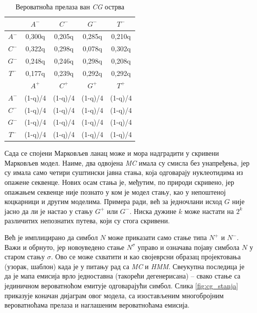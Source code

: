 \documentclass[12pt,oneside]{memoir}
\begin{document}
\begin{CJK}{UTF8}{ipxm}
\begin{table}[h!]
  \centering
  \caption{Вероватноћа прелаза ван \textit{CG} острва}
  \begin{tabular}{c | c c c c}
   & $A^-$ & $C^-$ & $G^-$ & $T^-$ \\ \hline
  $A^-$ & 0,300q & 0,205q & 0,285q & 0,210q \\
  $C^-$ & 0,322q & 0,298q & 0,078q & 0,302q \\
  $G^-$ & 0,248q & 0,246q & 0,298q & 0,208q \\
  $T^-$ & 0,177q & 0,239q & 0,292q & 0,292q \\ \hhline{= | = = = =}
   & $A^+$ & $C^+$ & $G^+$ & $T^+$ \\ \hline
  $A^-$ & (1-q)/4 & (1-q)/4 & (1-q)/4 & (1-q)/4 \\
  $C^-$ & (1-q)/4 & (1-q)/4 & (1-q)/4 & (1-q)/4 \\
  $G^-$ & (1-q)/4 & (1-q)/4 & (1-q)/4 & (1-q)/4 \\
  $T^-$ & (1-q)/4 & (1-q)/4 & (1-q)/4 & (1-q)/4
  \end{tabular}
  \label{tab:cg_hmm2}
\end{table}

Сада се спојени Марковљев ланац може и мора надградити у скривени Марковљев модел. Наиме, два одвојена \textit{MC} имала су смисла без унапређења, јер су имала само четири суштински јавна стања, која одговарају нуклеотидима из опажене секвенце. Нових осам стања је, међутим, по природи скривено, јер опажањем секвенце није познато у ком је модел стању, као у непоштеној коцкарници и другим моделима. Примера ради, већ за једночлани исход $G$ није јасно да ли је настао у стању $G^+$ или $G^-$. Ниска дужине $k$ може настати на $2^k$ различитих непознатих путева, који су стога скривени.

Већ је имплицирано да симбол $N$ може приказати само стање типа $N^+$ и $N^-$. Важи и обрнуто, јер новоуведено стање $N^\sigma$ управо и означава појаву симбола $N$ у старом стању $\sigma$. Ово се може схватити и као својеврсни образац пројектовања (узорак, шаблон) када је у питању рад са \textit{MC} и \textit{HMM}. Свеукупна последица је да је мапа емисија врло једноставна (такорећи дегенерисана) -- свако стање са јединичном вероватноћом емитује одговарајући симбол. Слика \ref{fig:cg_stanja} приказује коначан дијаграм овог модела, са изостављеним многобројним вероватноћама прелаза и наглашеним вероватноћама емисија.


\end{CJK}
\end{document}
